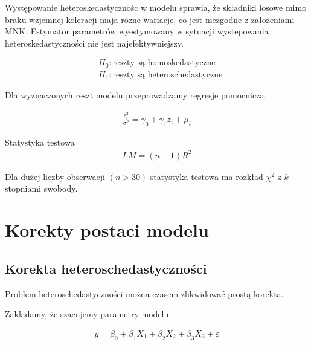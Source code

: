 Występowanie heteroskedastycznośc w modelu sprawia, że składniki losowe mimo braku wzjemnej koleracji maja rózne wariacje, co jest niezgodne z założeniami MNK.
Estymator parametrów wyestymowany w sytuacji wystepowania heteroskedastyczności nie jest najefektywniejszy.


\begin{equation}
    \begin{split}
        &H_0: \text{reszty są homoskedastyczne}\\
        &H_1: \text{reszty są heteroschedastyczne}
    \end{split}
\end{equation}

Dla wyznaczonych reszt modelu przeprowadzamy regresje pomocnicza

\begin{equation}
    \begin{split}
        \frac{\epsilon_{i}^{2}}{\sigma^2} = \gamma_{0} + \gamma_{1}z_{i} + \mu_{i}
    \end{split}
\end{equation}

Statystyka testowa
\begin{equation}
    \begin{split}
        LM = (n-1)R^{2}
    \end{split}
\end{equation}

Dla dużej liczby obserwacji \((n > 30)\) statystyka testowa ma rozkład \(\chi^{2}\) z \(k\) stopniami swobody.


\section{Korekty postaci modelu}\label{sec:korekty-postaci-modelu}

\subsection{Korekta heteroschedastyczności}\label{subsec:korekta-heteroschedastyczności---transformacja-modelu}

Problem heteroschedastyczności można czasem zlikwidować prostą korekta.

Zakladamy, że szacujemy parametry modelu

\begin{equation}
    \begin{split}
        y = \beta_{0} +\beta_{1}X_{1} + \beta_{2}X_{2} +\beta_{3}X_{3} + \varepsilon
    \end{split}
\end{equation}

